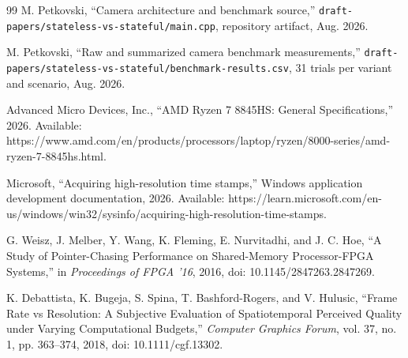 \begin{thebibliography}{99}
M. Petkovski, “Camera architecture and benchmark source,” \texttt{draft-papers/stateless-vs-stateful/main.cpp}, repository artifact, Aug. 2026.

M. Petkovski, “Raw and summarized camera benchmark measurements,” \texttt{draft-papers/stateless-vs-stateful/benchmark-results.csv}, 31 trials per variant and scenario, Aug. 2026.

Advanced Micro Devices, Inc., “AMD Ryzen 7 8845HS: General Specifications,” 2026. Available: https://www.amd.com/en/products/processors/laptop/ryzen/8000-series/amd-ryzen-7-8845hs.html.

Microsoft, “Acquiring high-resolution time stamps,” Windows application development documentation, 2026. Available: https://learn.microsoft.com/en-us/windows/win32/sysinfo/acquiring-high-resolution-time-stamps.

G. Weisz, J. Melber, Y. Wang, K. Fleming, E. Nurvitadhi, and J. C. Hoe, “A Study of Pointer-Chasing Performance on Shared-Memory Processor-FPGA Systems,” in \textit{Proceedings of FPGA '16}, 2016, doi: 10.1145/2847263.2847269.

K. Debattista, K. Bugeja, S. Spina, T. Bashford-Rogers, and V. Hulusic, “Frame Rate vs Resolution: A Subjective Evaluation of Spatiotemporal Perceived Quality under Varying Computational Budgets,” \textit{Computer Graphics Forum}, vol. 37, no. 1, pp. 363–374, 2018, doi: 10.1111/cgf.13302.
\end{thebibliography}



